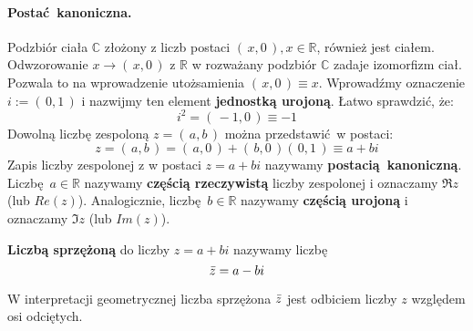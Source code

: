 \paragraph{Postać kanoniczna.} Podzbiór ciała $\mathds{C}$ złożony z liczb postaci $(\,x,0\,), x \in \mathds{R}$, również jest ciałem. Odwzorowanie $x \rightarrow (\,x,0\,)$ z $\mathds{R}$ w rozważany podzbiór $\mathds{C}$ zadaje izomorfizm ciał. Pozwala to na wprowadzenie utożsamienia $(\,x,0\,) \equiv x$. Wprowadźmy oznaczenie $i := (\,0,1\,)$ i nazwijmy ten element \textbf{jednostką urojoną}. Łatwo sprawdzić, że:
\begin{equation*}
    i^2 = (\,-1,0\,) \equiv -1
\end{equation*}
Dowolną liczbę zespoloną $z = (\,a,b\,)$ można przedstawić w postaci:
\begin{equation*}
    z = (\,a,b\,) = (\,a,0\,) + (\,b,0\,)(\,0,1\,) \equiv a+bi
\end{equation*}
Zapis liczby zespolonej z w postaci $z = a+bi$ nazywamy \textbf{postacią kanoniczną}. Liczbę $a \in \mathds{R}$ nazywamy \textbf{częścią rzeczywistą} liczby zespolonej i oznaczamy $\Re{z}$ (lub $Re(z)$). Analogicznie, liczbę $b \in \mathds{R}$ nazywamy \textbf{częścią urojoną} i oznaczamy $\Im{z}$ (lub $Im(z)$).
\begin{definition}
    \textbf{Liczbą sprzężoną} do liczby $z = a+bi$ nazywamy liczbę
    \begin{equation*}
        \bar{z} = a-bi
    \end{equation*}
\end{definition}
\begin{center}
\end{center}
W interpretacji geometrycznej liczba sprzężona $\bar{z}$ jest odbiciem liczby $z$ względem osi odciętych.
